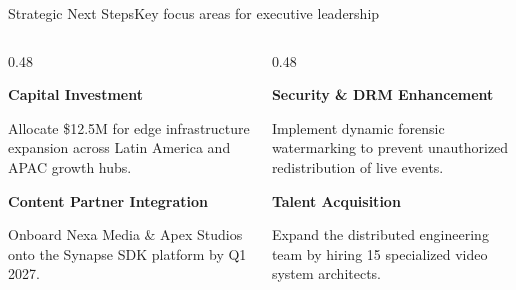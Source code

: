 \documentclass[aspectratio=169,11pt]{beamer}
\begin{document}
\begin{frame}{Strategic Next Steps}{Key focus areas for executive leadership}
  \vspace{2pt}
  \begin{columns}[T]
    \begin{column}{0.48\textwidth}
      \begin{tcolorbox}[keynotecard]
        {\small\bfseries\color{accentblue}\faHdd\quad Capital Investment} \par
        \vspace{2pt}
        {\tiny\color{textmuted} Allocate \$12.5M for edge infrastructure expansion across Latin America and APAC growth hubs.}
      \end{tcolorbox}
      \vspace{3pt}
      \begin{tcolorbox}[keynotecard]
        {\small\bfseries\color{accentblue}\faHandshake\quad Content Partner Integration} \par
        \vspace{2pt}
        {\tiny\color{textmuted} Onboard Nexa Media \& Apex Studios onto the Synapse SDK platform by Q1 2027.}
      \end{tcolorbox}
    \end{column}
    
    \begin{column}{0.48\textwidth}
      \begin{tcolorbox}[keynotecard]
        {\small\bfseries\color{accentpurple}\faLock\quad Security \& DRM Enhancement} \par
        \vspace{2pt}
        {\tiny\color{textmuted} Implement dynamic forensic watermarking to prevent unauthorized redistribution of live events.}
      \end{tcolorbox}
      \vspace{3pt}
      \begin{tcolorbox}[keynotecard]
        {\small\bfseries\color{accentpurple}\faUsers\quad Talent Acquisition} \par
        \vspace{2pt}
        {\tiny\color{textmuted} Expand the distributed engineering team by hiring 15 specialized video system architects.}
      \end{tcolorbox}
    \end{column}
  \end{columns}
\end{frame}
\end{document}
